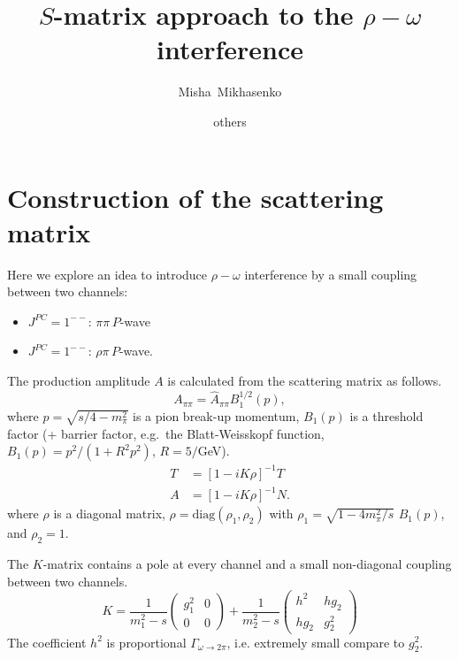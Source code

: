 \documentclass[aps,prd,superscriptaddress,onecolumn,nofootinbib,preprintnumbers,notitlepage]{revtex4-1}
\begin{document}
\title{$S$-matrix approach to the $\rho-\omega$ interference}
\author{Misha~Mikhasenko}
\author{others}

\nopagebreak
\maketitle

\graphicspath{{../plots/}}

\section{Construction of the scattering matrix}

Here we explore an idea to introduce $\rho-\omega$ interference by a small coupling
between two channels:
\begin{itemize}
  \item $J^{PC}=1^{--}$: $\pi\pi\,P$-wave
  \item $J^{PC}=1^{--}$: $\rho\pi\,P$-wave.
\end{itemize}

The production amplitude $A$ is calculated from the scattering matrix as follows.
\begin{equation}
  A_{\pi\pi} = \hat{A}_{\pi\pi} B_1^{1/2}(p),
\end{equation}
where $p = \sqrt{s/4-m_\pi^2}$ is a pion break-up momentum,
$B_1(p)$ is a threshold factor (+ barrier factor, e.g.\ the Blatt-Weisskopf function, $B_1(p) = p^2/(1+R^2p^2)$, $R=5/$GeV). %
\begin{align} \label{eq:T.2x2}
  T &= \left[1-i K \rho \right]^{-1} T\\
  A &= \left[1-i K \rho \right]^{-1} N.
\end{align}
where $\rho$ is a diagonal matrix, $\rho = \text{diag}(\rho_1,\rho_2)$ with $\rho_1 = \sqrt{1-4m_\pi^2/s}\,\,B_1(p)$, and $\rho_2 = 1$.

The $K$-matrix contains a pole at every channel and a small non-diagonal coupling between two channels.
\begin{equation} \label{eq:K}
  K = \frac{1}{m_1^2-s}\begin{pmatrix}
    g_1^2 & 0\\
    0 & 0
  \end{pmatrix} +
  \frac{1}{m_2^2-s}\begin{pmatrix}
    h^2 & hg_2\\
    hg_2 & g_2^2
  \end{pmatrix}
\end{equation}
The coefficient $h^2$ is proportional $\Gamma_{\omega\to 2\pi}$, i.e. extremely small compare to $g_2^2$.
\end{document}
